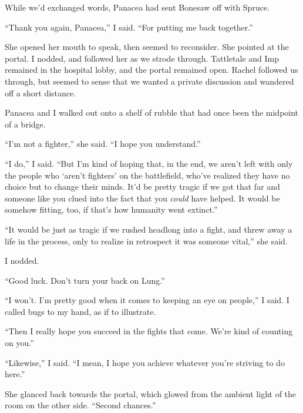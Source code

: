 While we'd exchanged words, Panacea had sent Bonesaw off with Spruce.



``Thank you again, Panacea,'' I said.  ``For putting me back together.''



She opened her mouth to speak, then seemed to reconsider.  She pointed at the portal.  I nodded, and followed her as we strode through.  Tattletale and Imp remained in the hospital lobby, and the portal remained open.  Rachel followed us through, but seemed to sense that we wanted a private discussion and wandered off a short distance.



Panacea and I walked out onto a shelf of rubble that had once been the midpoint of a bridge.



``I'm not a fighter,'' she said.  ``I hope you understand.''



``I do,'' I said.  ``But I'm kind of hoping that, in the end, we aren't left with only the people who `aren't fighters' on the battlefield, who've realized they have no choice but to change their minds.  It'd be pretty tragic if we got that far and someone like you clued into the fact that you \emph{could} have helped.  It would be somehow fitting, too, if that's how humanity went extinct.''



``It would be just as tragic if we rushed headlong into a fight, and threw away a life in the process, only to realize in retrospect it was someone vital,'' she said.



I nodded.



``Good luck.  Don't turn your back on Lung.''



``I won't.  I'm pretty good when it comes to keeping an eye on people,'' I said.  I called bugs to my hand, as if to illustrate.



``Then I really hope you succeed in the fights that come.  We're kind of counting on you.''



``Likewise,'' I said.  ``I mean, I hope you achieve whatever you're striving to do here.''



She glanced back towards the portal, which glowed from the ambient light of the room on the other side.  ``Second chances.''



